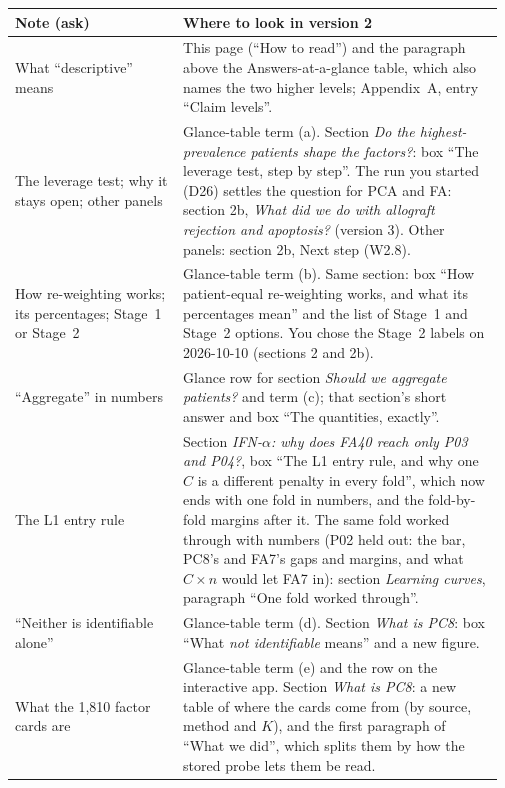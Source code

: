 \documentclass[11pt]{article}
\begin{document}
{\footnotesize
\setlength{\tabcolsep}{4pt}
\renewcommand{\arraystretch}{1.12}
\begin{longtable}{@{}>{\raggedright\arraybackslash}p{0.33\linewidth} >{\raggedright\arraybackslash}p{0.635\linewidth}@{}}
\toprule
\textbf{Note (ask)} & \textbf{Where to look in version 2} \\
\midrule
\endhead
01 What ``descriptive'' means & This page (``How to read'') and the paragraph above the Answers-at-a-glance table, which also names the two higher levels; Appendix~A, entry ``Claim levels''. \\
02 The leverage test; why it stays open; other panels & Glance-table term (a). Section \emph{Do the highest-prevalence patients shape the factors?}: box ``The leverage test, step by step''. The run you started (D26) settles the question for PCA and FA: section 2b, \emph{What did we do with allograft rejection and apoptosis?} (version 3). Other panels: section 2b, Next step (W2.8). \\
03 How re-weighting works; its percentages; Stage~1 or Stage~2 & Glance-table term (b). Same section: box ``How patient-equal re-weighting works, and what its percentages mean'' and the list of Stage~1 and Stage~2 options. You chose the Stage~2 labels on 2026-10-10 (sections 2 and 2b). \\
04 ``Aggregate'' in numbers & Glance row for section \emph{Should we aggregate patients?} and term (c); that section's short answer and box ``The quantities, exactly''. \\
05 The L1 entry rule & Section \emph{IFN-$\alpha$: why does FA40 reach only P03 and P04?}, box ``The L1 entry rule, and why one $C$ is a different penalty in every fold'', which now ends with one fold in numbers, and the fold-by-fold margins after it. The same fold worked through with numbers (P02 held out: the bar, PC8's and FA7's gaps and margins, and what $C \times n$ would let FA7 in): section \emph{Learning curves}, paragraph ``One fold worked through''. \\
06 ``Neither is identifiable alone'' & Glance-table term (d). Section \emph{What is PC8}: box ``What \emph{not identifiable} means'' and a new figure. \\
07 What the 1,810 factor cards are & Glance-table term (e) and the row on the interactive app. Section \emph{What is PC8}: a new table of where the cards come from (by source, method and $K$), and the first paragraph of ``What we did'', which splits them by how the stored probe lets them be read. \\

\end{longtable}}
\end{document}
